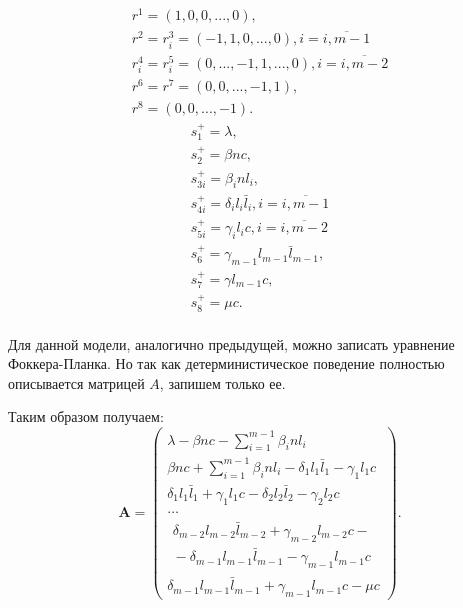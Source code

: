 \documentclass[floatfix,
showkeys,
twocolumn, nofootinbib, superscriptaddress, ]{revtex4-1}
\begin{document}
\begin{equation} 
\label{bt:8}
\begin{gathered}
r^{1}  =(1,0,0,...,0), \\
r^{2}  =r_i^3=(-1,1,0,...,0), i=\overline{i, m-1} \\
r_i^4  =r_i^5=(0,...,-1,1,...,0), i=\overline{i, m-2} \\
r^{6}  =r^7=(0,0,...,-1,1), \\
r^{8}  =(0,0,...,-1).
\end{gathered}
\end{equation}
\begin{equation} 
\label{bt:9}
\begin{gathered}
s^{+}_1  =\lambda, \\
s^{+}_2  =\beta n c, \\
s^{+}_{3i}  =\beta_i n l_i, \\
s^{+}_{4i}  =\delta_i l_i \bar{l}_i, i=\overline{i, m-1}\\
s^{+}_{5i}  =\gamma_i l_i c, i=\overline{i, m-2}\\
s^{+}_{6}  =\gamma_{m-1} l_{m-1} \bar{l}_{m-1}, \\
s^{+}_{7}  =\gamma l_{m-1} c, \\
s^{+}_{8}  =\mu c. \\
\end{gathered}
\end{equation}

Для данной модели, аналогично предыдущей, можно записать уравнение
Фоккера-Планка. Но так как детерминистическое поведение полностью
описывается матрицей $A$, запишем только ее.

Таким образом получаем:
\begin{equation}
\label{bt:10}
    \mathbf A =
    \begin{pmatrix}
    \lambda - \beta n c - \sum_{i=1}^{m-1} \beta_i n l_i \\
    \beta n c + \sum_{i=1}^{m-1} \beta_i n l_i -\delta_1 l_1 \bar{l}_1 - \gamma_1 l_1 c \\
      \delta_1 l_1 \bar{l}_1 + \gamma_1 l_1 c -  \delta_2 l_2 \bar{l}_2 - \gamma_2 l_2 c  \\
     \ldots \\
     \begin{multlined}
       \delta_{m-2} l_{m-2} \bar{l}_{m-2} + \gamma_{m-2} l_{m-2} c -
       {} \\ {} -
       \delta_{m-1} l_{m-1} \bar{l}_{m-1} - \gamma_{m-1} l_{m-1} c 
     \end{multlined}
     \\ 
      \delta_{m-1} l_{m-1} \bar{l}_{m-1} + \gamma_{m-1} l_{m-1} c  - \mu c 
    \end{pmatrix}.
\end{equation}
\end{document}
